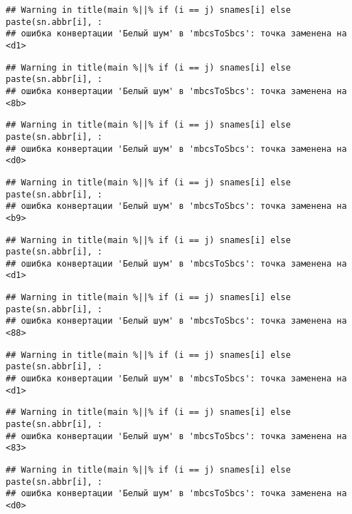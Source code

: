 \documentclass[
]{article}
\begin{document}
\begin{verbatim}
## Warning in title(main %||% if (i == j) snames[i] else paste(sn.abbr[i], :
## ошибка конвертации 'Белый шум' в 'mbcsToSbcs': точка заменена на <d1>
\end{verbatim}

\begin{verbatim}
## Warning in title(main %||% if (i == j) snames[i] else paste(sn.abbr[i], :
## ошибка конвертации 'Белый шум' в 'mbcsToSbcs': точка заменена на <8b>
\end{verbatim}

\begin{verbatim}
## Warning in title(main %||% if (i == j) snames[i] else paste(sn.abbr[i], :
## ошибка конвертации 'Белый шум' в 'mbcsToSbcs': точка заменена на <d0>
\end{verbatim}

\begin{verbatim}
## Warning in title(main %||% if (i == j) snames[i] else paste(sn.abbr[i], :
## ошибка конвертации 'Белый шум' в 'mbcsToSbcs': точка заменена на <b9>
\end{verbatim}

\begin{verbatim}
## Warning in title(main %||% if (i == j) snames[i] else paste(sn.abbr[i], :
## ошибка конвертации 'Белый шум' в 'mbcsToSbcs': точка заменена на <d1>
\end{verbatim}

\begin{verbatim}
## Warning in title(main %||% if (i == j) snames[i] else paste(sn.abbr[i], :
## ошибка конвертации 'Белый шум' в 'mbcsToSbcs': точка заменена на <88>
\end{verbatim}

\begin{verbatim}
## Warning in title(main %||% if (i == j) snames[i] else paste(sn.abbr[i], :
## ошибка конвертации 'Белый шум' в 'mbcsToSbcs': точка заменена на <d1>
\end{verbatim}

\begin{verbatim}
## Warning in title(main %||% if (i == j) snames[i] else paste(sn.abbr[i], :
## ошибка конвертации 'Белый шум' в 'mbcsToSbcs': точка заменена на <83>
\end{verbatim}

\begin{verbatim}
## Warning in title(main %||% if (i == j) snames[i] else paste(sn.abbr[i], :
## ошибка конвертации 'Белый шум' в 'mbcsToSbcs': точка заменена на <d0>
\end{verbatim}
\end{document}
